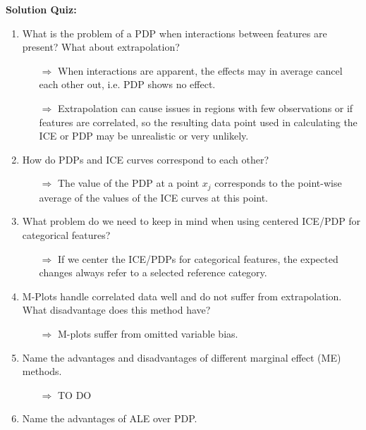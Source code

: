 \textbf{Solution Quiz:}\\\noindent
\medskip

\begin{enumerate}
    \item What is the problem of a PDP when interactions between features are present? What about extrapolation?
    \begin{itemize}
        \item[$\Rightarrow$] When interactions are apparent, the effects may in average cancel each other out, i.e. PDP shows no effect.
        \item[$\Rightarrow$] Extrapolation can cause issues in regions with few observations or if features are correlated, so the resulting data point used in calculating the ICE or PDP may be unrealistic or very unlikely.
    \end{itemize}
    \item How do PDPs and ICE curves correspond to each other?
    \begin{itemize}
        \item[$\Rightarrow$] The value of the PDP at a point $x_j$ corresponds to the point-wise average of the values of the ICE curves at this point.
    \end{itemize}
    \item What problem do we need to keep in mind when using centered ICE/PDP for categorical features? 
    \begin{itemize}
        \item[$\Rightarrow$] If we center the ICE/PDPs for categorical features, the expected changes always refer to a selected reference category. 
    \end{itemize}
    \item M-Plots handle correlated data well and do not suffer from extrapolation. What disadvantage does this method have?
    \begin{itemize}
        \item[$\Rightarrow$] M-plots suffer from omitted variable bias.
    \end{itemize}
    \item Name the advantages and disadvantages of different marginal effect (ME) methods.
    \begin{itemize}
        \item[$\Rightarrow$] TO DO
    \end{itemize}
    \item Name the advantages of ALE over PDP.
    \begin{itemize}

\end{itemize}
\end{enumerate}
